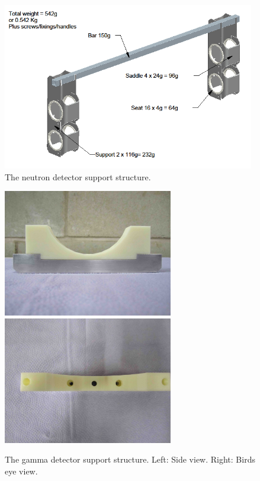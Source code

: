 \begin{figure}[htbp]
\begin{center}
\includegraphics[width=110mm]{Chapter6/figures/neutronDetectorRackGraphic.png}
\caption{The neutron detector support structure.}
\label{fig:neutronDetectorRack}
\end{center}
\end{figure}

\begin{figure}[htbp]
\begin{center}
\includegraphics[width=74mm]{Chapter6/figures/gammaSupport1.jpg}
\includegraphics[width=74mm]{Chapter6/figures/gammaSupport2.jpg}
\caption{The gamma detector support structure. Left: Side view. Right: Birds eye view.}
\label{fig:gammaSupportStructure}
\end{center}
\end{figure}

